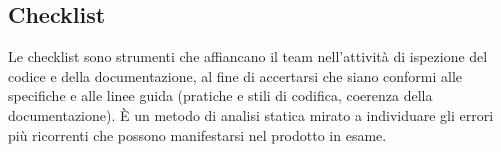 \subsection{Checklist}

\par Le checklist sono strumenti che affiancano il team nell'attività di ispezione del codice e della documentazione, al fine di accertarsi che siano conformi alle specifiche e alle linee guida (pratiche e stili di codifica, coerenza della documentazione). È un metodo di analisi statica mirato a individuare gli errori più ricorrenti che possono manifestarsi nel prodotto in esame.

\clearpage



